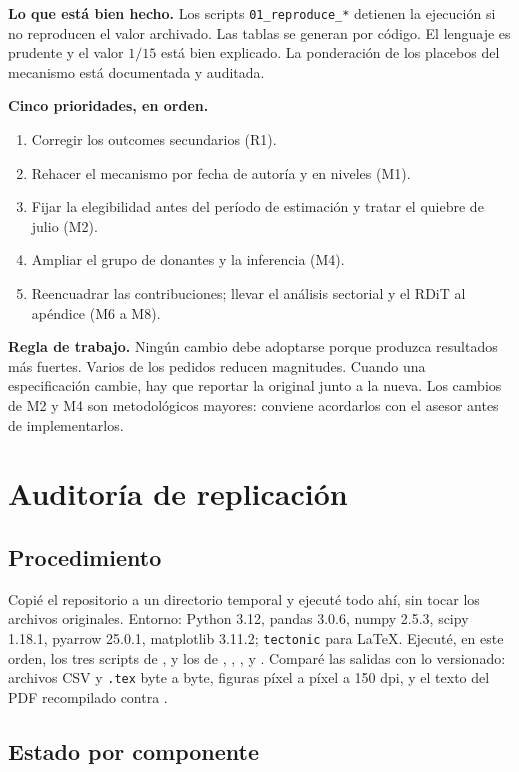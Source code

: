 \documentclass[11pt,a4paper]{article}
\newcommand{\cod}[1]{\texttt{#1}}
\begin{document}
\textbf{Lo que está bien hecho.} Los scripts \cod{01\_reproduce\_*} detienen la ejecución si no
reproducen el valor archivado. Las tablas se generan por código. El lenguaje es prudente y el valor
$1/15$ está bien explicado. La ponderación de los placebos del mecanismo está documentada y auditada.

\textbf{Cinco prioridades, en orden.}
\begin{enumerate}
\item Corregir los outcomes secundarios (R1).
\item Rehacer el mecanismo por fecha de autoría y en niveles (M1).
\item Fijar la elegibilidad antes del período de estimación y tratar el quiebre de julio (M2).
\item Ampliar el grupo de donantes y la inferencia (M4).
\item Reencuadrar las contribuciones; llevar el análisis sectorial y el RDiT al apéndice (M6 a M8).
\end{enumerate}

\textbf{Regla de trabajo.} Ningún cambio debe adoptarse porque produzca resultados más fuertes. Varios
de los pedidos reducen magnitudes. Cuando una especificación cambie, hay que reportar la original junto
a la nueva. Los cambios de M2 y M4 son metodológicos mayores: conviene acordarlos con el asesor antes de
implementarlos.

\section{Auditoría de replicación}

\subsection{Procedimiento}

Copié el repositorio a un directorio temporal y ejecuté todo ahí, sin tocar los archivos originales.
Entorno: Python 3.12, pandas 3.0.6, numpy 2.5.3, scipy 1.18.1, pyarrow 25.0.1, matplotlib 3.11.2;
\cod{tectonic} para LaTeX. Ejecuté, en este orden, los tres scripts de
, y los de , ,
,  y . Comparé las salidas con
lo versionado: archivos CSV y \cod{.tex} byte a byte, figuras píxel a píxel a 150 dpi, y el texto del
PDF recompilado contra .

\subsection{Estado por componente}
\end{document}
